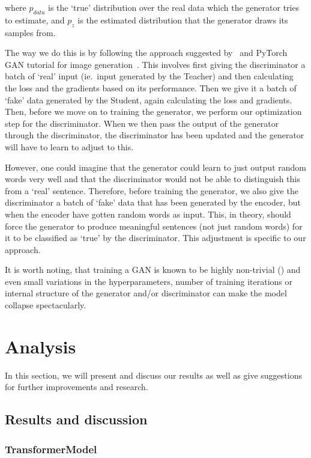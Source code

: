 \documentclass{article}
\begin{document}
where $p_{data}$ is the `true' distribution over the real data which the
generator tries to estimate, and $p_z$ is the estimated distribution that the
generator draws its samples from.

The way we do this is by following the approach suggested
by~\cite{Goodfellow2014GenerativeAN} and PyTorch GAN tutorial for image
generation~\cite{pytorchTutorialGAN}. This involves first giving the
discriminator a batch of `real' input (ie.\ input generated by the Teacher) and
then calculating the loss and the gradients based on its performance. Then we
give it a batch of `fake' data generated by the Student, again calculating the
loss and gradients. Then, before we move on to training the generator, we
perform our optimization step for the discriminator. When we then pass the
output of the generator through the discriminator, the discriminator has been
updated and the generator will have to learn to adjust to this. 

However, one could imagine that the generator could learn to just output random
words very well and that the discriminator would not be able to distinguish this
from a `real' sentence. Therefore, before training the generator, we also give
the discriminator a batch of `fake' data that has been generated by the encoder,
but when the encoder have gotten random words as input. This, in theory, should
force the generator to produce meaningful sentences (not just random words) for
it to be classified as `true' by the discriminator. This adjustment is specific to
our approach.

It is worth noting, that training a GAN is known to be highly non-trivial
(\cite{Hui2018}) and even small variations in the hyperparameters, number of training
iterations or internal structure of the generator and/or discriminator can make
the model collapse spectacularly.

\section{Analysis}\label{sec:analysis}

In this section, we will present and discuss our results as well as give
suggestions for further improvements and research.

\subsection{Results and discussion}\label{sec:results}

\subsubsection{TransformerModel}
\end{document}
